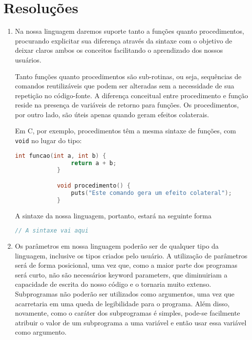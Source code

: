 \documentclass[12pt, a4paper]{article}
\begin{document}
\section{Resoluções}
    \begin{enumerate}
        \item
        Na nossa linguagem daremos suporte tanto a funções quanto
        procedimentos, procurando explicitar sua diferença através da sintaxe
        com o objetivo de deixar claros ambos os conceitos facilitando o
        aprendizado dos nossos usuários.

        Tanto funções quanto procedimentos são sub-rotinas, ou seja,
        sequências de comandos reutilizáveis que podem ser alteradas sem a
        necessidade de sua repetição no código-fonte. A diferença
        conceitual entre procedimento e função reside na presença de
        variáveis de retorno para funções. Os procedimentos, por outro lado,
        são úteis apenas quando geram efeitos colaterais.

        Em C, por exemplo, procedimentos têm a mesma sintaxe de funções, com
        \texttt{void} no lugar do tipo:

        \begin{lstlisting}[language=C]
            int funcao(int a, int b) {
                return a + b;
            }

            void procedimento() {
                puts("Este comando gera um efeito colateral");
            }
        \end{lstlisting}

        \begin{comment}
            <function>  ::= function id "(" <parameters_list> ")" "{"
            <stmts> <return> "}"

            Definindo sintaticamente um procedimento, temos:

            <procedure> ::= procedure id "(" <parameters_list> ")" "{"
            <stmts> "}"
        \end{comment}

        A sintaxe da nossa linguagem, portanto, estará na seguinte forma

        \begin{lstlisting}[language=C]
            // A sintaxe vai aqui
        \end{lstlisting}

        \item
        Os parâmetros em nossa linguagem poderão ser de qualquer tipo da
        linguagem, inclusive os tipos criados pelo usuário. A utilização de
        parâmetros será de forma posicional, uma vez que, como a maior parte
        dos programas será curto, não são necessários keyword parameters, que
        diminuiriam a capacidade de escrita do nosso código e o tornaria muito
        extenso. Subprogramas não poderão ser utilizados como argumentos, uma
        vez que acarretaria em uma queda de legibilidade para o programa. Além
        disso, novamente, como o caráter dos subprogramas é simples, pode-se
        facilmente atribuir o valor de um subprograma a uma variável e então
        usar essa variável como argumento.


\end{enumerate}
\end{document}
